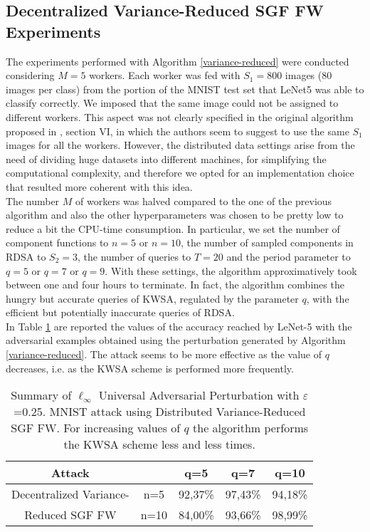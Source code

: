 \subsection{Decentralized Variance-Reduced SGF FW Experiments}
The experiments performed with Algorithm \ref{variance-reduced} were conducted considering $M=5$ workers. Each worker was fed with $S_1=800$ images (80 images per class) from the portion of the MNIST test set that LeNet5 was able to classify correctly. We imposed that the same image could not be assigned to different workers. This aspect was not clearly specified in the original algorithm proposed in \cite{A3}, section VI, in which the authors seem to suggest to use the same $S_1$ images for all the workers. However, the distributed data settings arise from the need of dividing huge datasets into different machines, for simplifying the computational complexity, and therefore we opted for an implementation choice that resulted more coherent with this idea.\\  The number $M$ of workers was halved compared to the one of the previous algorithm and also the other hyperparameters was chosen to be pretty low to reduce a bit the CPU-time consumption. In particular, we set the number of component functions to $n=5$ or $n=10$, the number of sampled components in RDSA to $S_2=3$, the number of queries to $T=20$ and the period parameter to $q=5$ or $q=7$ or $q=9$. With these settings, the algorithm approximatively took between one and four hours to terminate. In fact, the algorithm combines the hungry but accurate queries of KWSA, regulated by the parameter $q$, with the efficient but potentially inaccurate queries of RDSA.\\
In Table \ref{tab:vr} are reported the values of the accuracy reached by LeNet-5 with the adversarial examples obtained using the perturbation generated by Algorithm \ref{variance-reduced}. The attack seems to be more effective as the value of $q$ decreases, i.e. as the KWSA scheme is performed more frequently.\\
\begin{table}[htbp]
	\begin{center}
		\begin{adjustwidth}{-.6cm}{}
			\begin{tabular}{c|cccc}
				\textbf{Attack} &    &      q=5 &      q=7 &     q=10 \\
				\midrule
				{\small Decentralized Variance-}  & n=5   &    92,37\% &    97,43\% &       94,18\% \\
				{\small Reduced SGF FW}     &  n=10&  84,00\% &    93,66\% &       98,99\% \\
			\end{tabular}
		\end{adjustwidth}
	\end{center}
\caption{{\small Summary of $\ell_\infty$ Universal Adversarial Perturbation with $\varepsilon$=0.25. MNIST attack using Distributed Variance-Reduced
		SGF FW. For increasing values of $q$ the algorithm performs the KWSA scheme less and less times.}}
	\label{tab:vr}
\end{table}
